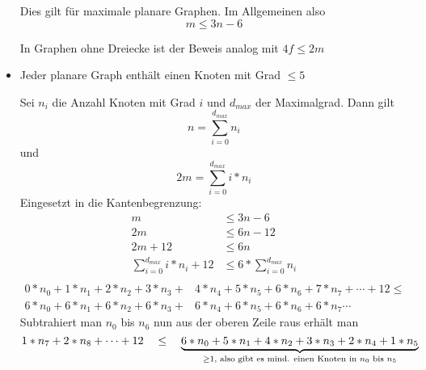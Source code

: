 \documentclass[10pt,a4paper]{article}
\begin{document}
\begin{itemize}
        Dies gilt für maximale planare Graphen.
        Im Allgemeinen also
        $$m \leq 3n-6$$

        In Graphen ohne Dreiecke ist der Beweis analog mit $4f\leq2m$


    \item Jeder planare Graph enthält einen Knoten mit Grad $\leq 5$

        Sei $n_i$ die Anzahl Knoten mit Grad $i$ und $d_{max}$ der Maximalgrad.
        Dann gilt
        $$n=\sum_{i=0}^{d_{max}}{n_i}$$
        und
        $$2m=\sum_{i=0}^{d_{max}}{i*n_i}$$
        Eingesetzt in die Kantenbegrenzung:
        \begin{align*}
            m &\leq 3n-6\\
            2m &\leq 6n-12\\
            2m+12 &\leq 6n\\
            \sum_{i=0}^{d_{max}}{i*n_i} + 12 &\leq 6*\sum_{i=0}^{d_{max}}{n_i}\\
        \end{align*}
        \begin{align*}
            0*n_0+1*n_1+2*n_2+3*n_3+&4*n_4+5*n_5+6*n_6+7*n_7+\cdots + 12 \leq\\
            6*n_0+6*n_1+6*n_2+6*n_3+&6*n_4+6*n_5+6*n_6+6*n_7\cdots
        \end{align*}
        Subtrahiert man $n_0$ bis $n_6$ nun aus der oberen Zeile raus erhält man
        $$1*n_7+2*n_8+\cdots + 12 ~~~\leq~~~ \underbrace{6*n_0+5*n_1+4*n_2+3*n_3+2*n_4+1*n_5}_{\geq 1\text{, also gibt es mind. einen Knoten in }n_0\text{ bis } n_5}\\$$
\end{itemize}
\end{document}
